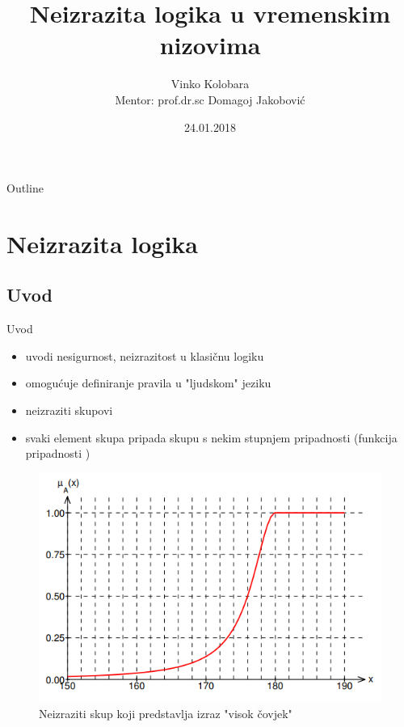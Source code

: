 \documentclass{beamer}
\title[Your Short Title]{Neizrazita logika u vremenskim nizovima}
\author[Vinko Kolobara]{Vinko Kolobara\\{\footnotesize Mentor: prof.dr.sc Domagoj Jakobović}}
\institute{Fakultet Elektrotehnike i Računarstva, Zagreb}
\date{24.01.2018}
\begin{document}
\begin{frame}
  \titlepage
\end{frame}

\begin{frame}{Outline}
  \tableofcontents
\end{frame}


\section{Neizrazita logika}

\subsection{Uvod}
\begin{frame}{Uvod}

\begin{itemize}
  \item uvodi nesigurnost, neizrazitost u klasičnu logiku
  \item omogućuje definiranje pravila u "ljudskom" jeziku
  \item neizraziti skupovi
  \item svaki element skupa pripada skupu s nekim stupnjem pripadnosti (funkcija pripadnosti )
\end{itemize}

\end{frame}

\begin{frame}{}
\begin{figure}[h]
  \includegraphics[width=\textwidth]{img/fuzzy_tall.png}
  \caption{Neizraziti skup koji predstavlja izraz "visok čovjek"}
\end{figure}
\end{frame}
\end{document}
